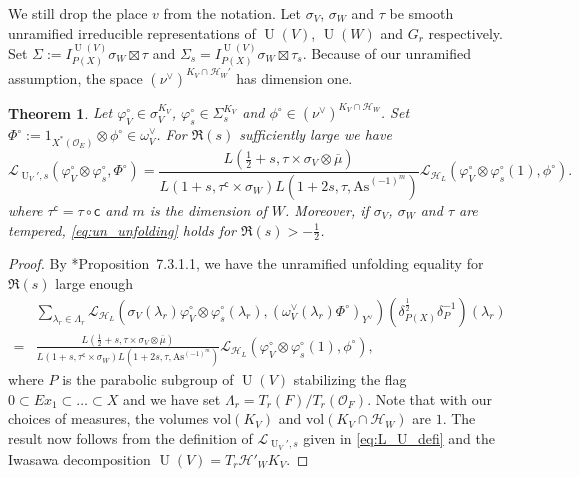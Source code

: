 \documentclass[letterpaper,11pt]{amsart}
\newcommand{\cH}{\mathcal{H}}
\newcommand{\cL}{\mathcal{L}}
\newcommand{\cO}{\mathcal{O}}
\newcommand{\<}{\negthickspace}
\DeclareMathOperator{\U}{U}
\theoremstyle{definition}
\theoremstyle{plain}
\newtheorem{theorem}[definition]{Theorem}
\theoremstyle{remark}
\numberwithin{equation}{section}
\begin{document}
We still drop the place $v$ from the notation. Let $\sigma_{V}$, $\sigma_{W}$ and $\tau$ be smooth unramified irreducible representations of $\U(V)$, $\U(W)$ and $G_{r}$ respectively. Set $\Sigma:=I_{P(X)}^{\U(V)} \sigma_{W} \boxtimes \tau$ and $\Sigma_{s} = I_{P(X)}^{\U(V)} \sigma_{W} \boxtimes \tau_{s}$. Because of our unramified assumption, the space $(\nu^\vee)^{K_{V} \cap \cH_W'}$ has dimension one. 

\begin{theorem}
\label{thm:L_function_equality}
Let $\varphi_{V}^\circ \in \sigma_{V}^{K_{V}}$, $\varphi_{s}^\circ \in \Sigma_{s}^{K_{V}}$ and $\phi^\circ \in (\nu^\vee)^{K_{V} \cap \cH_W}$. Set $\Phi^\circ := 1_{X^*(\cO_{E})} \otimes \phi^\circ \in \omega^\vee_{V}$. For $\Re(s)$ sufficiently large we have
\begin{equation}
    \cL_{\U_V',s}(\varphi_{V}^\circ \otimes \varphi_{s}^\circ , \Phi^\circ)=  \frac{L(\frac{1}{2}+s,\tau \times \sigma_{V} \otimes \overline{\mu})}{L(1+s,\tau^{\mathsf{c}} \times \sigma_{W})L(1+2s,\tau,\mathrm{As}^{(-1)^{m}})} \cL_{\cH_L}(\varphi_{V}^\circ \otimes\varphi_s^\circ(1) ,  \phi^\circ). \label{eq:un_unfolding}
\end{equation}
where $\tau^{\mathsf{c}}=\tau \circ \mathsf{c}$ and $m$ is the dimension of $W$. Moreover, if $\sigma_{V}$, $\sigma_{W}$ and $\tau$ are tempered, \eqref{eq:un_unfolding} holds for $\Re(s)>-\frac{1}{2}$.
\end{theorem}

\begin{proof}
    By \cite{Boi}*{Proposition~7.3.1.1}, we have the unramified unfolding equality for $\Re(s)$ large enough
    \begin{align}
\label{eq:L_unfold}
       &\sum_{\lambda_r \in \Lambda_{r}} \cL_{\cH_L}\left(\sigma_{V}(\lambda_r)\varphi^\circ_{V}  \otimes \varphi_{s}^\circ(\lambda_r) , (\omega^\vee_{V}(\lambda_r)\Phi^\circ)_{Y^\vee} \right)(\delta_{P(X)}^{\frac{1}{2}} \delta_{P}^{-1})(\lambda_r) \nonumber  \\
       =  &\frac{L(\frac{1}{2}+s,\tau \times \sigma_{V} \otimes \overline{\mu})}{L(1+s,\tau^{\mathsf{c}} \times \sigma_{W})L(1+2s,\tau,\mathrm{As}^{(-1)^{m}})}\cL_{\cH_L}(\varphi_{V}^\circ \otimes \varphi_{s}^\circ(1) ,\phi^\circ),
\end{align}
where $P$ is the parabolic subgroup of $\U(V)$ stabilizing the flag $0 \subset E x_1 \subset \hdots \subset X$ and we have set $\Lambda_{r}=T_r(F) / T_r(\cO_F)$. Note that with our choices of measures, the volumes $\mathrm{vol}(K_{V})$ and $\mathrm{vol}(K_{V} \cap \cH_W)$ are $1$. The result now follows from the definition of $\cL_{\U_V',s}$ given in \eqref{eq:L_U_defi} and the Iwasawa decomposition $\U(V)=T_r \cH'_W K_{V}$.
\end{proof}
\end{document}
